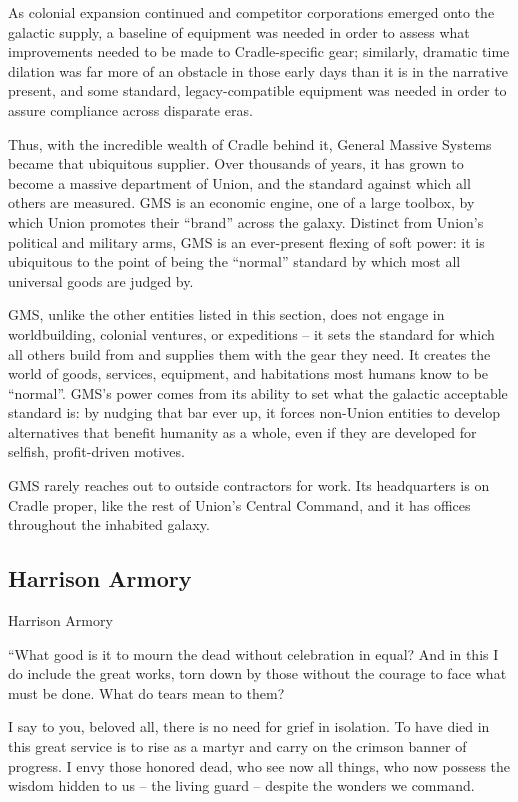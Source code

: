 As colonial expansion continued and competitor corporations emerged onto the galactic supply, a
baseline of equipment was needed in order to assess what improvements needed to be made to
Cradle-specific gear; similarly, dramatic time dilation was far more of an obstacle in those early
days than it is in the narrative present, and some standard, legacy-compatible equipment was
needed in order to assure compliance across disparate eras.




Thus, with the incredible wealth of Cradle behind it, General Massive Systems became that
ubiquitous supplier. Over thousands of years, it has grown to become a massive department of
Union, and the standard against which all others are measured. GMS is an economic engine, one
of a large toolbox, by which Union promotes their “brand” across the galaxy. Distinct from Union’s
political and military arms, GMS is an ever-present flexing of soft power: it is ubiquitous to the
point of being the “normal” standard by which most all universal goods are judged by.

GMS, unlike the other entities listed in this section, does not engage in worldbuilding, colonial
ventures, or expeditions -- it sets the standard for which all others build from and supplies them
with the gear they need. It creates the world of goods, services, equipment, and habitations most
humans know to be “normal”. GMS’s power comes from its ability to set what the galactic
acceptable standard is: by nudging that bar ever up, it forces non-Union entities to develop
alternatives that benefit humanity as a whole, even if they are developed for selfish, profit-driven
motives.

GMS rarely reaches out to outside contractors for work. Its headquarters is on Cradle proper, like
the rest of Union’s Central Command, and it has offices throughout the inhabited galaxy.

\subsection{Harrison Armory}
Harrison Armory

         “What good is it to mourn the dead without celebration in equal? And in this I do include the
         great works, torn down by those without the courage to face what must be done. What do
         tears mean to them?

         I say to you, beloved all, there is no need for grief in isolation. To have died in this great
         service is to rise as a martyr and carry on the crimson banner of progress. I envy those
         honored dead, who see now all things, who now possess the wisdom hidden to us -- the
         living guard -- despite the wonders we command.

